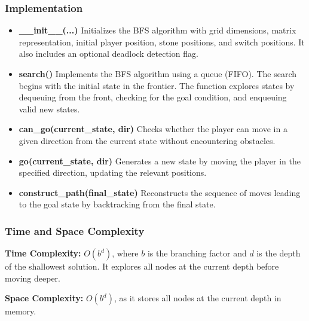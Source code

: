 \subsubsection{Implementation}
\begin{itemize}
    \item \textbf{\_\_init\_\_(...)}  
    Initializes the BFS algorithm with grid dimensions, matrix representation, initial player position, stone positions, and switch positions. It also includes an optional deadlock detection flag.

    \item \textbf{search()}  
    Implements the BFS algorithm using a queue (FIFO). The search begins with the initial state in the frontier. The function explores states by dequeuing from the front, checking for the goal condition, and enqueuing valid new states.

    \item \textbf{can\_go(current\_state, dir)}  
    Checks whether the player can move in a given direction from the current state without encountering obstacles.

    \item \textbf{go(current\_state, dir)}  
    Generates a new state by moving the player in the specified direction, updating the relevant positions.

    \item \textbf{construct\_path(final\_state)}  
    Reconstructs the sequence of moves leading to the goal state by backtracking from the final state.

\end{itemize}


\subsubsection{Time and Space Complexity}
\textbf{Time Complexity:} \( O(b^d) \), where \( b \) is the branching factor and \( d \) is the depth of the shallowest solution. It explores all nodes at the current depth before moving deeper.

\textbf{Space Complexity:} \( O(b^d) \), as it stores all nodes at the current depth in memory.